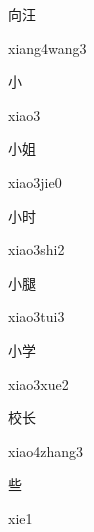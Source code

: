 \begin{multicols*}{2}
\begin{verbete}{向汪}
\begin{pronuncia}{xiang4wang3}
\end{pronuncia}
\end{verbete}

\begin{verbete}[xiao3]{小}
\begin{pronuncia}{xiao3}
\end{pronuncia}
\end{verbete}

\begin{verbete}{小姐}
\begin{pronuncia}{xiao3jie0}
\end{pronuncia}
\end{verbete}

\begin{verbete}{小时}
\begin{pronuncia}{xiao3shi2}
\end{pronuncia}
\end{verbete}

\begin{verbete}{小腿}
\begin{pronuncia}{xiao3tui3}
\end{pronuncia}
\end{verbete}

\begin{verbete}{小学}
\begin{pronuncia}{xiao3xue2}
\end{pronuncia}
\end{verbete}

\begin{verbete}{校长}
\begin{pronuncia}{xiao4zhang3}
\end{pronuncia}
\end{verbete}

\begin{verbete}[xie1]{些}
\begin{pronuncia}{xie1}
\end{pronuncia}
\end{verbete}


\end{multicols*}
